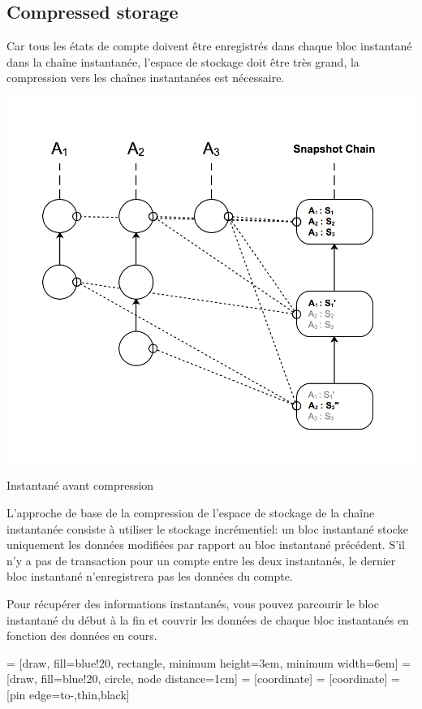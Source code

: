 \documentclass[UTF8,nofonts]{article}
\makeatletter
\newenvironment{figurehere}
 {\def\@captype{figure}}
 {}
\makeatother
\begin{document}
\begin{multicols}{2}
\subsection{Compressed storage}
Car tous les états de compte doivent être enregistrés dans chaque bloc instantané dans la chaîne instantanée, l'espace de stockage doit être très grand, la compression vers les chaînes instantanées est nécessaire.

\begin{center}
\begin{figurehere}
\includegraphics[width=.7\linewidth]{image/compact-snapshot.png}
\caption{Instantané avant compression}
\end{figurehere}
\end{center}

L'approche de base de la compression de l'espace de stockage de la chaîne instantanée consiste à utiliser le stockage incrémentiel: un bloc instantané stocke uniquement les données modifiées par rapport au bloc instantané précédent. S'il n'y a pas de transaction pour un compte entre les deux instantanés, le dernier bloc instantané n'enregistrera pas les données du compte.

Pour récupérer des informations instantanés, vous pouvez parcourir le bloc instantané du début à la fin et couvrir les données de chaque bloc instantanés en fonction des données en cours.

\begin{center}
\begin{figurehere}
\centering
{} = [draw, fill=blue!20, rectangle, 
    minimum height=3em, minimum width=6em]
 = [draw, fill=blue!20, circle, node distance=1cm]
 = [coordinate]
 = [coordinate]
 = [pin edge={to-,thin,black}]


\end{figurehere}
\end{center}
\end{multicols}
\end{document}
